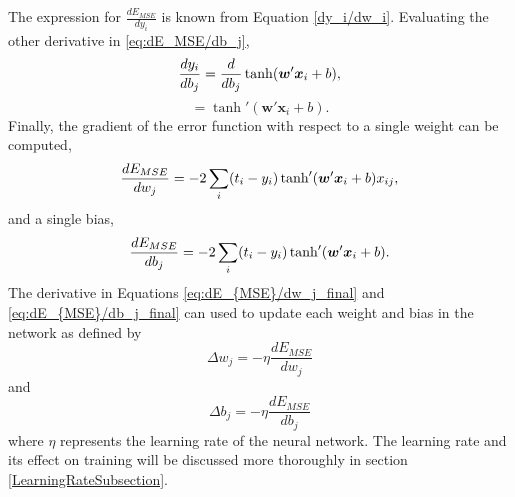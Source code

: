 %
The expression for $\frac{dE_{MSE}}{dy_i}$ is known from Equation \ref{dy_i/dw_i}. Evaluating the other derivative in \ref{eq:dE_MSE/db_j},
%
\begin{equation} \label{dE_{MSE}/dw_j}
\frac{dy_i}{db_j} = \frac{d}{db_j} \tanh(\boldsymbol{w}'\boldsymbol{x}_i + b),
\end{equation}
%
\begin{equation} \label{dy_i/db_j}
 = \tanh'( \boldsymbol{w}' \boldsymbol{x}_i + b).
\end{equation}
%
Finally, the gradient of the error function with respect to a single weight can be computed, 
%
\begin{equation} \label{eq:dE_{MSE}/dw_j_final}
\frac{dE_{MSE}}{dw_j} =  -2 \sum_i  (t_i - y_i) \tanh'( \boldsymbol{w}' \boldsymbol{x}_i + b)  x_{ij},
\end{equation}
%
and a single bias,
%
\begin{equation} \label{eq:dE_{MSE}/db_j_final}
\frac{dE_{MSE}}{db_j} =  -2 \sum_i  (t_i - y_i) \tanh'( \boldsymbol{w}' \boldsymbol{x}_i + b).
\end{equation}
%
The derivative in Equations \ref{eq:dE_{MSE}/dw_j_final} and \ref{eq:dE_{MSE}/db_j_final} can used to update each weight and bias in the network as defined by 
%
\begin{equation} \label{eq:update1}
\Delta w_{j} = - \eta \frac{dE_{MSE}}{dw_j}
\end{equation}
%
and 
%
\begin{equation} \label{eq:update2}
\Delta b_{j} = - \eta \frac{dE_{MSE}}{db_j}
\end{equation}
%
where $\eta$ represents the learning rate of the neural network. The learning rate and its effect on training will be discussed more thoroughly in section \ref{LearningRateSubsection}.

